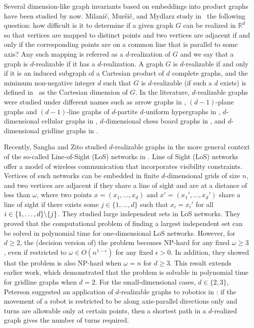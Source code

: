 \documentclass[12pt,a4paper,titlepage,openany]{report}
\begin{document}
Several dimension-like graph invariants based on embeddings into product graphs have been studied by now. Milani\v c, Mur\v si\v c, and Mydlarz study in~\cite{Milanic} the following question: how difficult is it to determine if a given graph $G$ can be realized in $\mathbb{R}^d$ so that vertices are mapped to distinct points and two vertices are adjacent if and only if the corresponding points are on a common line that is parallel to some axis? Any such mapping is referred as a $d$-realization of $G$ and we say that a graph is $d$-realizable if it has a $d$-realization. A graph $G$ is $d$-realizable if and only if it is an induced subgraph of a Cartesian product of $d$ complete graphs, and the minimum non-negative integer $d$ such that $G$ is $d$-realizable (if such a $d$ exists) is defined in~\cite{Milanic} as the Cartesian dimension of $G$. In the literature, $d$-realizable graphs were studied under different names such as arrow graphs in \cite{Cook}, $(d - 1)$-plane graphs and $(d -1)$-line graphs of $d$-partite $d$-uniform hypergraphs in \cite{Bermond}, $d$-dimensional cellular graphs in \cite{Gurvich}, $d$-dimensional chess board graphs in \cite{Staton}, and $d$-dimensional gridline graphs in \cite{Peterson}.

Recently, Sangha and Zito studied $d$-realizable graphs in the more general context of the so-called Line-of-Sight (LoS) networks in \cite{Zito}. Line of Sight (LoS) networks offer a model of wireless communication that incorporates visibility constraints. Vertices of such networks can be embedded in finite $d$-dimensional grids of size $n$, and two vertices are adjacent if they share a line of sight and are at a distance of less than $\omega$, where two points $x=(x_1, \ldots,x_d)$ and $x'=(x_1',\ldots ,x_d')$ share a line of sight if there exists some $j\in \{1,\ldots,d\}$ such that $x_i=x_i'$ for all $i\in \{1,\ldots,d\} \symbol{92} \{j\}$. They studied large independent sets in LoS networks. They proved that the computational problem of finding a largest independent set can be solved in polynomial time for one-dimensional LoS networks. However, for $d \geq 2$, the (decision version of) the problem becomes NP-hard for any fixed $\omega \geq 3$, even if restricted to $\omega \in O(n^{1-\epsilon})$ for any fixed $\epsilon>0$. In addition, they showed that the problem is also NP-hard when $\omega = n$ for $d \geq 3$. This result extends earlier work, which demonstrated that the problem is solvable in polynomial time for gridline graphs when $d = 2$. For the small-dimensional cases, $d \in \{2, 3\}$, Peterson suggested an application of $d$-realizable graphs to robotics in \cite{Peterson}: if the movement of a robot is restricted to be along axis-parallel directions only and turns are allowable only at certain points, then a shortest path in a $d$-realized graph gives the number of turns required.
\end{document}
